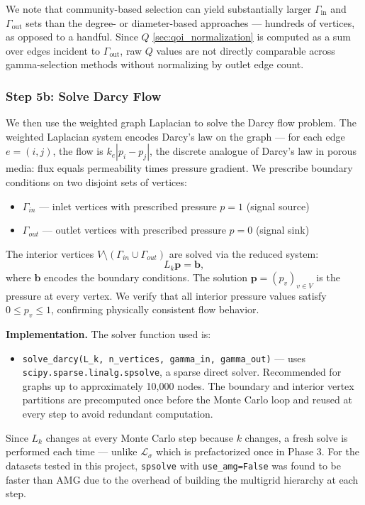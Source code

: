 \documentclass[a4paper,12pt]{amsart}
\numberwithin{equation}{section}
\def\bb{{\mathbf b}}
\def\bp{{\mathbf p}}
\renewcommand{\L}{{\mathcal L}}
\begin{document}
We note that community-based selection can yield substantially larger 
$\Gamma_{\text{in}}$ and $\Gamma_{\text{out}}$ sets than the degree- or 
diameter-based approaches — hundreds of vertices, as opposed to a 
handful. Since $Q$ \ref{sec:qoi_normalization} is computed as a sum over 
edges incident to $\Gamma_{\text{out}}$, raw $Q$ values are not directly 
comparable across gamma-selection methods without normalizing by 
outlet edge count.

\subsubsection{Step 5b: Solve Darcy Flow}
\label{sec:darcy}

We then use the weighted graph Laplacian to solve the Darcy flow problem. 
The weighted Laplacian system encodes Darcy's law on the graph — for each 
edge $e = (i,j)$, the flow is $k_e|p_i - p_j|$, the discrete analogue 
of Darcy's law in porous media: flux equals permeability times pressure 
gradient. We prescribe boundary conditions on two disjoint sets of vertices:
\begin{itemize}[noitemsep, topsep=0pt, leftmargin=3em]
    \item $\Gamma_{in}$ — inlet vertices with prescribed pressure $p = 1$ 
    (signal source)
    \item $\Gamma_{out}$ — outlet vertices with prescribed pressure $p = 0$ 
    (signal sink)
\end{itemize}
The interior vertices $V \setminus (\Gamma_{in} \cup \Gamma_{out})$ are 
solved via the reduced system:
\begin{equation}
L_k \bp = \bb,
\end{equation}
where $\bb$ encodes the boundary conditions. The solution $\bp = (p_v)_{v \in V}$ 
is the pressure at every vertex. We verify that all interior pressure values 
satisfy $0 \leq p_v \leq 1$, confirming physically consistent flow behavior.

\textbf{Implementation.} The solver function used is:
\begin{itemize}[noitemsep, topsep=4pt, leftmargin=3em]
    \item \texttt{solve\_darcy(L\_k, n\_vertices, gamma\_in, gamma\_out)} 
    — uses\\ \texttt{scipy.sparse.linalg.spsolve}, a sparse direct solver. 
    Recommended for graphs up to approximately 10,000 nodes. The boundary 
    and interior vertex partitions are precomputed once before the Monte 
    Carlo loop and reused at every step to avoid redundant computation.
\end{itemize}
Since $L_k$ changes at every Monte Carlo step because $k$ changes, a 
fresh solve is performed each time — unlike $\L_\sigma$ which 
is prefactorized once in Phase 3. For the datasets tested in this project, 
\texttt{spsolve} with \texttt{use\_amg=False} was found to be faster than 
AMG due to the overhead of building the multigrid hierarchy at each step.
\end{document}
